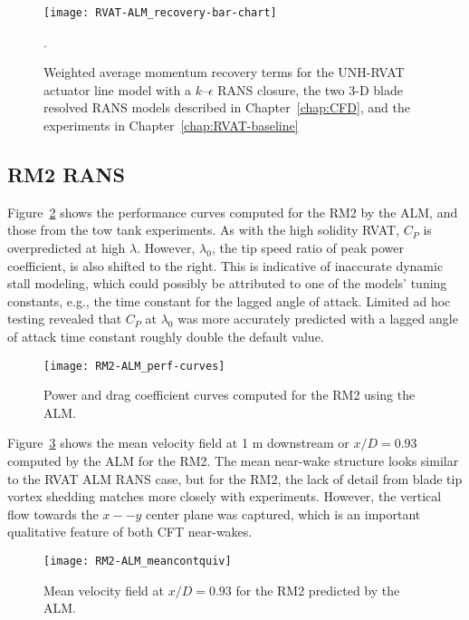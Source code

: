 \begin{figure}
    \centering
    
    \texttt{[image: RVAT-ALM\_recovery-bar-chart]}

    \caption{Weighted average momentum recovery terms for the UNH-RVAT actuator
        line model with a $k$--$\epsilon$ RANS closure, the two 3-D blade resolved
        RANS models described in Chapter~\ref{chap:CFD}, and the experiments in
        Chapter~\ref{chap:RVAT-baseline}}.
    
    \label{fig:RVAT-ALM-recovery}
\end{figure}


\subsection{RM2 RANS}

Figure~\ref{fig:RM2-ALM-perf-curves} shows the performance curves computed for
the RM2 by the ALM, and those from the tow tank experiments. As with the high
solidity RVAT, $C_P$ is overpredicted at high $\lambda$. However, $\lambda_0$,
the tip speed ratio of peak power coefficient, is also shifted to the right.
This is indicative of inaccurate dynamic stall modeling, which could possibly be
attributed to one of the models' tuning constants, e.g., the time constant for
the lagged angle of attack. Limited ad hoc testing revealed that $C_P$ at
$\lambda_0$ was more accurately predicted with a lagged angle of attack time
constant roughly double the default value.

\begin{figure}
    \centering
    
    \texttt{[image: RM2-ALM\_perf-curves]}
    
    \caption{Power and drag coefficient curves computed for the RM2 using the
        ALM.}
    
    \label{fig:RM2-ALM-perf-curves}
\end{figure}

Figure~\ref{fig:RM2-ALM-meancontquiv} shows the mean velocity field at 1 m
downstream or $x/D=0.93$ computed by the ALM for the RM2. The mean near-wake
structure looks similar to the RVAT ALM RANS case, but for the RM2, the lack of
detail from blade tip vortex shedding matches more closely with experiments.
However, the vertical flow towards the $x--y$ center plane was captured, which
is an important qualitative feature of both CFT near-wakes.

\begin{figure}
    \centering
    
    \texttt{[image: RM2-ALM\_meancontquiv]}
    
    \caption{Mean velocity field at $x/D=0.93$ for the RM2 predicted by the
        ALM.}
    
    \label{fig:RM2-ALM-meancontquiv}
\end{figure}

